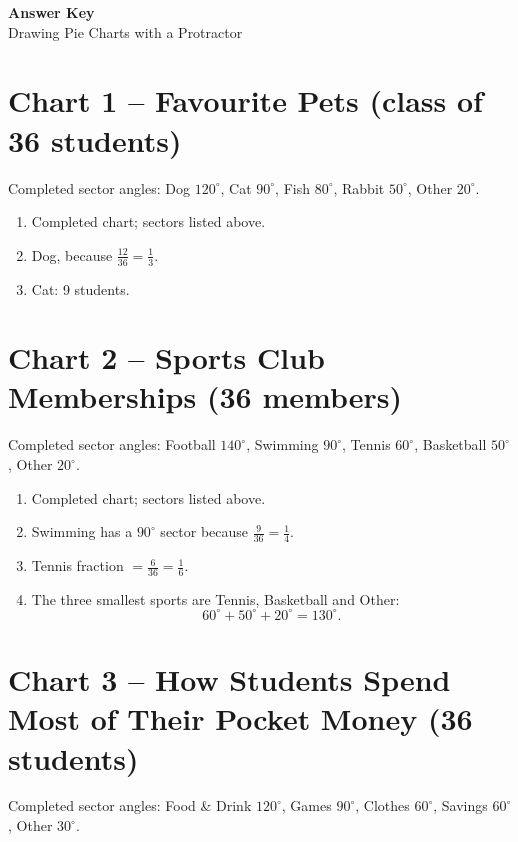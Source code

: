 \documentclass[a4paper,12pt]{article}
\begin{document}
\begin{center}
  {\LARGE\bfseries Answer Key}\\[4pt]
  {\large Drawing Pie Charts with a Protractor}
\end{center}

\vspace{4pt}

\section*{Chart 1 -- Favourite Pets (class of 36 students)}

Completed sector angles: Dog \(120^\circ\), Cat \(90^\circ\), Fish \(80^\circ\), Rabbit \(50^\circ\), Other \(20^\circ\).

\begin{enumerate}[leftmargin=1.6em, itemsep=2pt]
  \item Completed chart; sectors listed above.
  \item Dog, because \(\frac{12}{36}=\frac{1}{3}\).
  \item Cat: 9 students.
\end{enumerate}

\section*{Chart 2 -- Sports Club Memberships (36 members)}

Completed sector angles: Football \(140^\circ\), Swimming \(90^\circ\), Tennis \(60^\circ\), Basketball \(50^\circ\), Other \(20^\circ\).

\begin{enumerate}[leftmargin=1.6em, itemsep=2pt]
  \item Completed chart; sectors listed above.
  \item Swimming has a \(90^\circ\) sector because \(\frac{9}{36}=\frac{1}{4}\).
  \item Tennis fraction \(=\frac{6}{36}=\frac{1}{6}\).
  \item The three smallest sports are Tennis, Basketball and Other:
  \[
  60^\circ+50^\circ+20^\circ=130^\circ.
  \]
\end{enumerate}

\section*{Chart 3 -- How Students Spend Most of Their Pocket Money (36 students)}

Completed sector angles: Food \& Drink \(120^\circ\), Games \(90^\circ\), Clothes \(60^\circ\), Savings \(60^\circ\), Other \(30^\circ\).
\end{document}
